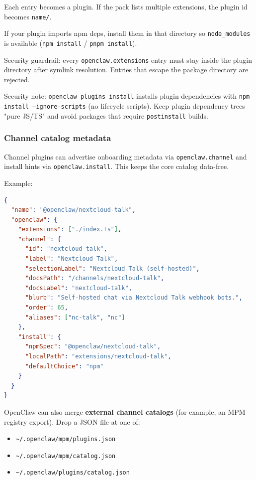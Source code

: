 Each entry becomes a plugin. If the pack lists multiple extensions, the plugin id
becomes \texttt{name/}.

If your plugin imports npm deps, install them in that directory so
\texttt{node\_modules} is available (\texttt{npm install} / \texttt{pnpm install}).

Security guardrail: every \texttt{openclaw.extensions} entry must stay inside the plugin
directory after symlink resolution. Entries that escape the package directory are
rejected.

Security note: \texttt{openclaw plugins install} installs plugin dependencies with
\texttt{npm install --ignore-scripts} (no lifecycle scripts). Keep plugin dependency
trees "pure JS/TS" and avoid packages that require \texttt{postinstall} builds.

\subsubsection{Channel catalog metadata}


Channel plugins can advertise onboarding metadata via \texttt{openclaw.channel} and
install hints via \texttt{openclaw.install}. This keeps the core catalog data-free.

Example:

\begin{lstlisting}[language=json]
{
  "name": "@openclaw/nextcloud-talk",
  "openclaw": {
    "extensions": ["./index.ts"],
    "channel": {
      "id": "nextcloud-talk",
      "label": "Nextcloud Talk",
      "selectionLabel": "Nextcloud Talk (self-hosted)",
      "docsPath": "/channels/nextcloud-talk",
      "docsLabel": "nextcloud-talk",
      "blurb": "Self-hosted chat via Nextcloud Talk webhook bots.",
      "order": 65,
      "aliases": ["nc-talk", "nc"]
    },
    "install": {
      "npmSpec": "@openclaw/nextcloud-talk",
      "localPath": "extensions/nextcloud-talk",
      "defaultChoice": "npm"
    }
  }
}
\end{lstlisting}


OpenClaw can also merge \textbf{external channel catalogs} (for example, an MPM
registry export). Drop a JSON file at one of:

\begin{itemize}
  \item \texttt{\textasciitilde{}/.openclaw/mpm/plugins.json}
  \item \texttt{\textasciitilde{}/.openclaw/mpm/catalog.json}
  \item \texttt{\textasciitilde{}/.openclaw/plugins/catalog.json}
\end{itemize}


